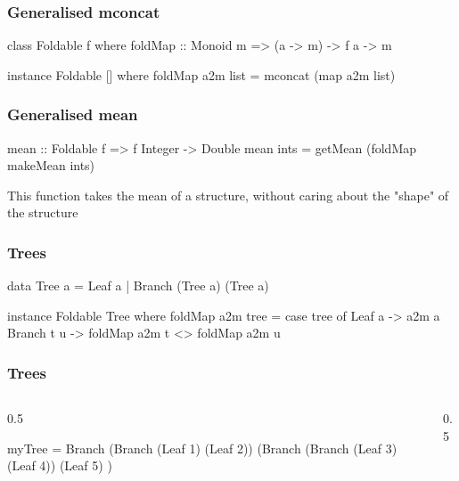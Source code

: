 \documentclass[UKenglish,usenames,dvipsnames,svgnames,table,aspectratio=169,mathserif]{beamer}
\begin{document}
\begin{frame}[fragile]
\frametitle{Generalised mconcat}
\begin{center}
\begin{minipage}{0.6\textwidth}
\begin{haskellcode}
class Foldable f where
  foldMap :: Monoid m => (a -> m) -> f a -> m
\end{haskellcode}
\pause
\begin{haskellcode}
instance Foldable [] where
  foldMap a2m list = mconcat (map a2m list)
\end{haskellcode}
\end{minipage}
\end{center}
\end{frame}


\begin{frame}[fragile]
\frametitle{Generalised mean}
\begin{center}
\begin{minipage}{0.6\textwidth}
\begin{haskellcode}
mean :: Foldable f => f Integer -> Double
mean ints = getMean (foldMap makeMean ints)
\end{haskellcode}
\medskip

This function takes the mean of a structure, without caring about the "shape" of the structure
\end{minipage}
\end{center}
\end{frame}


\begin{frame}[fragile]
\frametitle{Trees}
\begin{center}
\begin{minipage}{0.6\textwidth}
\begin{haskellcode}
data Tree a = Leaf a | Branch (Tree a) (Tree a)

\end{haskellcode}

\pause
\begin{haskellcode}
instance Foldable Tree where
  foldMap a2m tree =
    case tree of
      Leaf a -> a2m a
      Branch t u ->
        foldMap a2m t <> foldMap a2m u
\end{haskellcode}
\end{minipage}
\end{center}
\end{frame}


\begin{frame}[fragile]
\frametitle{Trees}
\begin{columns}
\begin{column}{0.5\textwidth}
\begin{haskellcode}
myTree =
  Branch
    (Branch (Leaf 1) (Leaf 2))
    (Branch
      (Branch (Leaf 3) (Leaf 4))
      (Leaf 5)
    )
\end{haskellcode}
\end{column}
\begin{column}{0.5\textwidth}

\end{column}
\end{columns}
\end{frame}
\end{document}
